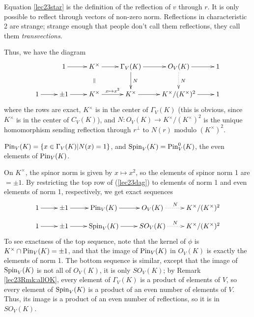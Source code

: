  \begin{remark}
   Equation \ref{lec23star} is the definition of the reflection of $v$ through $r$. It is
   only possible to reflect through vectors of non-zero norm. Reflections in
   characteristic 2 are strange; strange enough that people don't call them reflections,
   they call them \emph{transvections}.
 \end{remark}

 Thus, we have the diagram
 \begin{equation}
  \xymatrix{
    &1 \ar[r] & K^\times \ar[r] \ar@{}[d]|{\|} & \Gamma_V(K) \ar[d]^N
        \ar[r] & O_V(K) \ar[r] \ar@{.>}[d]^N & 1\\
    1 \ar[r] & \pm 1 \ar[r] & K^\times \ar[r]^{x\mapsto x^2} & K^\times \ar[r] &
        K^\times/(K^\times)^2 \ar[r] & 1}
  \label{lec23dag}
 \end{equation}
 where the rows are exact, $K^\times$ is in
 the center of $\Gamma_V(K)$ (this is obvious, since $K^\times$ is in the center of
 $C_V(K)$), and $N:O_V(K)\to K^\times/(K^\times)^2$ is the unique homomorphism sending
 reflection through $r^\perp$ to $N(r)$ modulo $(K^\times)^2$.



 \begin{definition}
   $\operatorname{Pin}_V(K) = \{x\in \Gamma_V(K)| N(x)=1\}$, and $\operatorname{Spin}_V(K) =\operatorname{Pin}_V^0(K)$, the even
   elements of $\operatorname{Pin}_V(K)$.
 \end{definition}
 On $K^\times$, the spinor norm is given by $x\mapsto x^2$, so the elements of spinor
 norm 1 are $=\pm 1$. By restricting the top row of (\ref{lec23dag}) to elements of norm
 1 and even elements of norm 1, respectively, we get exact sequences
 \[
 \xymatrix @R=1em{
    1\ar[r] &\pm 1 \ar[r] & \pin_V(K) \ar[r] & O_V(K) \ar@{.>}[r]^(.45)N & K^\times/(K^\times)^2 \\
    1\ar[r] &\pm 1 \ar[r] & \spin_V(K) \ar[r] & SO_V(K) \ar@{.>}[r]^(.45)N & K^\times/(K^\times)^2
 }
 \]
 To see exactness of the top sequence, note that the kernel of $\phi$ is $K^\times\cap
 \operatorname{Pin}_V(K)=\pm 1$, and that the image of $\operatorname{Pin}_V(K)$ in $O_V(K)$ is exactly the elements
 of norm 1. The bottom sequence is similar, except that the image of $\operatorname{Spin}_V(K)$ is not
 all of $O_V(K)$, it is only $SO_V(K)$; by Remark \ref{lec23Rmk:allOK}, every element of
 $\Gamma_V(K)$ is a product of elements of $V$, so every element of $\operatorname{Spin}_V(K)$ is a
 product of an even number of elements of $V$. Thus, its image is a product of an even
 number of reflections, so it is in $SO_V(K)$.

